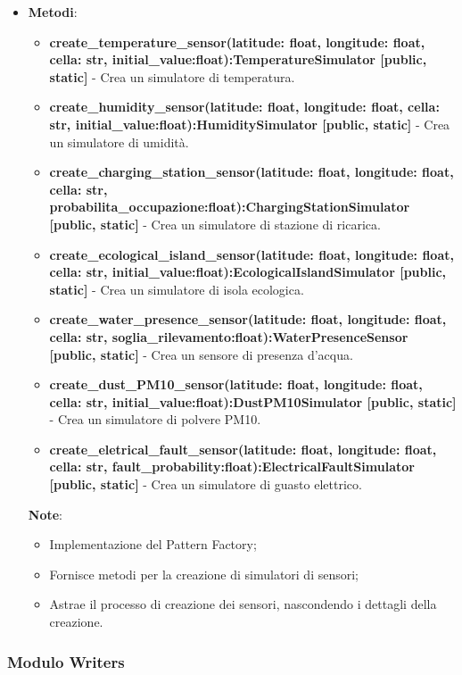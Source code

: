 \begin{itemize}
    \begin{itemize}
        \item    \textbf{Metodi}: 
\begin{itemize}
    \item \textbf{create\_temperature\_sensor(latitude: float, longitude: float, cella: str, initial\_value:float):TemperatureSimulator [public, static]} - Crea un simulatore di temperatura.
    \item \textbf{create\_humidity\_sensor(latitude: float, longitude: float, cella: str, initial\_value:float):HumiditySimulator [public, static]} - Crea un simulatore di umidità.
    \item \textbf{create\_charging\_station\_sensor(latitude: float, longitude: float, cella: str, probabilita\_occupazione:float):ChargingStationSimulator [public, static]} - Crea un simulatore di stazione di ricarica.
    \item \textbf{create\_ecological\_island\_sensor(latitude: float, longitude: float, cella: str, initial\_value:float):EcologicalIslandSimulator [public, static]} - Crea un simulatore di isola ecologica.
    \item \textbf{create\_water\_presence\_sensor(latitude: float, longitude: float, cella: str, soglia\_rilevamento:float):WaterPresenceSensor [public, static]} - Crea un sensore di presenza d'acqua.
    \item \textbf{create\_dust\_PM10\_sensor(latitude: float, longitude: float, cella: str, initial\_value:float):DustPM10Simulator [public, static]} - Crea un simulatore di polvere PM10.
    \item \textbf{create\_eletrical\_fault\_sensor(latitude: float, longitude: float, cella: str, fault\_probability:float):ElectricalFaultSimulator [public, static]} - Crea un simulatore di guasto elettrico.
\end{itemize}
\textbf{Note}:
    \begin{itemize}
        \item Implementazione del Pattern Factory;
        \item Fornisce metodi per la creazione di simulatori di sensori;
        \item Astrae il processo di creazione dei sensori, nascondendo i dettagli della creazione.
    \end{itemize}
\end{itemize}
\end{itemize}

\subsubsection{Modulo Writers} \label{sec:writersModule}

